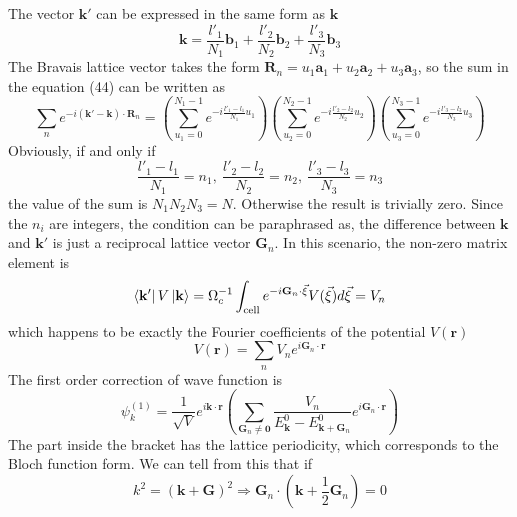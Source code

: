 \documentclass{article}
\begin{document}
The vector $\mathbf{k}'$ can be expressed in the same form as $\mathbf{k}$\begin{equation}
    \mathbf{k}=\frac{l'_1}{N_1}\mathbf{b}_1+\frac{l'_2}{N_2}\mathbf{b}_2+\frac{l'_3}{N_3}\mathbf{b}_3
\end{equation}
The Bravais lattice vector takes the form $\mathbf{R}_n=u_1\mathbf{a}_1+u_2\mathbf{a}_2+u_3\mathbf{a}_3$, so the sum in the equation (44) can be written as\begin{equation}
    \sum_n{e^{-i(\mathbf{k}'-\mathbf{k})\cdot\mathbf{R}_n}}=(\sum_{u_1=0}^{N_1-1}e^{-i\frac{l'_1-l_1}{N_1}u_1})(\sum_{u_2=0}^{N_2-1}e^{-i\frac{l'_2-l_2}{N_2}u_2})(\sum_{u_3=0}^{N_3-1}e^{-i\frac{l'_3-l_3}{N_3}u_3})
\end{equation}
Obviously, if and only if\begin{equation}
    \frac{l'_1-l_1}{N_1}=n_1,~\frac{l'_2-l_2}{N_2}=n_2,~\frac{l'_3-l_3}{N_3}=n_3
\end{equation}
the value of the sum is $N_1N_2N_3=N$. Otherwise the result is trivially zero. Since the $n_i$ are integers, the condition can be paraphrased as, the difference between $\mathbf{k}$ and $\mathbf{k'}$ is just a reciprocal lattice vector $\mathbf{G}_n$. In this scenario, the non-zero matrix element is\begin{equation}
    \bra{\mathbf{k}'}V\ket{\mathbf{k}}=\Omega_c^{-1}\int_{\mathrm{cell}}e^{-i\mathbf{G}_n\cdot\vec\xi}V(\vec\xi)d\vec\xi=V_n
\end{equation}
which happens to be exactly the Fourier coefficients of the potential $V(\mathbf{r})$\begin{equation}
    V(\mathbf{r})=\sum_n{V_n}e^{i\mathbf{G}_n\cdot\mathbf{r}}
\end{equation}
The first order correction of wave function is\begin{equation}
    \psi_k^{(1)}=\frac{1}{\sqrt{V}}e^{i\mathbf{k}\cdot\mathbf{r}}(\sum_{\mathbf{G}_n\neq{\mathbf{0}}}\frac{V_n}{E_\mathbf{k}^0-E_{\mathbf{k}+\mathbf{G}_n}^0}e^{i\mathbf{G}_n\cdot\mathbf{r}})
\end{equation}
The part inside the bracket has the lattice periodicity, which corresponds to the Bloch function form. We can tell from this that if\begin{equation}
    k^2=(\mathbf{k}+\mathbf{G})^2\Rightarrow{\mathbf{G}_n\cdot(\mathbf{k}+\frac12\mathbf{G}_n)}=0
\end{equation}
\end{document}
